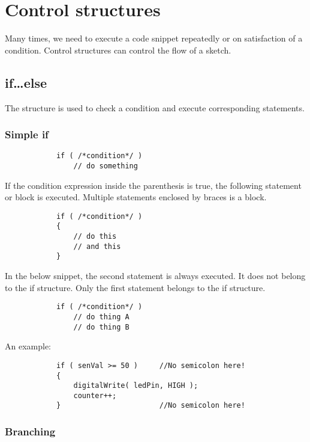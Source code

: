 \documentclass{article}
\begin{document}
\section{Control structures}

	Many times, we need to execute a code snippet repeatedly or on satisfaction of a condition. Control structures can control the flow of a sketch. 

	\subsection{if\ldots else}

		The  structure is used to check a condition and execute corresponding statements.

		\subsubsection{Simple if}

			\begin{lstlisting}
			if ( /*condition*/ )
				// do something
			\end{lstlisting}

			If the condition expression inside the parenthesis is true, the following statement or block is executed. Multiple statements enclosed by braces is a block.

			\begin{lstlisting}
			if ( /*condition*/ )
			{
				// do this
				// and this
			}
			\end{lstlisting}

			In the below snippet, the second statement is always executed. It does not belong to the if structure. Only the first statement belongs to the if structure.

			\begin{lstlisting}
			if ( /*condition*/ )
				// do thing A
				// do thing B
			\end{lstlisting}

			An example:

			\begin{lstlisting}
			if ( senVal >= 50 )		//No semicolon here!
			{
				digitalWrite( ledPin, HIGH );
				counter++;
			}						//No semicolon here!
			\end{lstlisting}

		\subsubsection{Branching}
\end{document}
